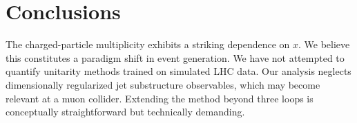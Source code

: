 \section{Conclusions}\label{sec:conclusions}

The charged-particle multiplicity exhibits a striking dependence on $x$.
We believe this constitutes a paradigm shift in event generation. We
have not attempted to quantify unitarity methods trained on simulated
LHC data. Our analysis neglects dimensionally regularized jet
substructure observables, which may become relevant at a muon collider.
Extending the method beyond three loops is conceptually straightforward
but technically demanding.

